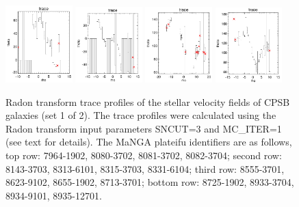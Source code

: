 \documentclass[fleqn,usenatbib]{mnras}
\begin{document}
\begin{figure}
    \includegraphics[width=0.23\textwidth]{Images/trace-plots/trace-plots-cpsbs/8725-1902.png}
    \includegraphics[width=0.23\textwidth]{Images/trace-plots/trace-plots-cpsbs/8933-3704.png}
    \includegraphics[width=0.23\textwidth]{Images/trace-plots/trace-plots-cpsbs/8934-9101.png}
    \includegraphics[width=0.23\textwidth]{Images/trace-plots/trace-plots-cpsbs/8935-12701.png}
    \caption{Radon transform trace profiles of the stellar velocity fields of CPSB galaxies (set 1 of 2). The trace profiles were calculated using the Radon transform input parameters SNCUT=3 and MC\_ITER=1 (see text for details). The MaNGA plateifu identifiers are as follows, top row: 7964-1902, 8080-3702, 8081-3702, 8082-3704; second row: 8143-3703, 8313-6101, 8315-3703, 8331-6104; third row: 8555-3701, 8623-9102, 8655-1902, 8713-3701; bottom row: 8725-1902, 8933-3704, 8934-9101, 8935-12701.}
    \label{fig:Radon-traces-CPSBs-1}
\end{figure}
\end{document}
